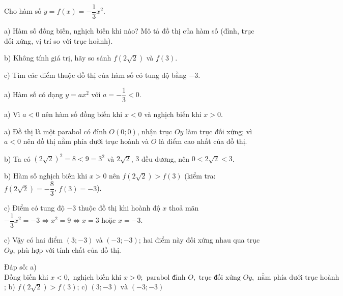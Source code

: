 \begin{problem}[9DS-HSB2-003]
Cho hàm số $y = f(x) = -\dfrac{1}{3}x^2$.

a) Hàm số đồng biến, nghịch biến khi nào? Mô tả đồ thị của hàm số (đỉnh, trục đối xứng, vị trí so với trục hoành).

b) Không tính giá trị, hãy so sánh $f\left(2\sqrt{2}\right)$ và $f(3)$.

c) Tìm các điểm thuộc đồ thị của hàm số có tung độ bằng $-3$.

\begin{solution}
a) Hàm số có dạng $y = ax^2$ với $a = -\dfrac{1}{3} < 0$.

a) Vì $a < 0$ nên hàm số đồng biến khi $x < 0$ và nghịch biến khi $x > 0$.

a) Đồ thị là một parabol có đỉnh $O(0; 0)$, nhận trục $Oy$ làm trục đối xứng; vì $a < 0$ nên đồ thị nằm phía dưới trục hoành và $O$ là điểm cao nhất của đồ thị.

b) Ta có $\left(2\sqrt{2}\right)^2 = 8 < 9 = 3^2$ và $2\sqrt{2}$, $3$ đều dương, nên $0 < 2\sqrt{2} < 3$.

b) Hàm số nghịch biến khi $x > 0$ nên $f\left(2\sqrt{2}\right) > f(3)$ (kiểm tra: $f\left(2\sqrt{2}\right) = -\dfrac{8}{3}$, $f(3) = -3$).

c) Điểm có tung độ $-3$ thuộc đồ thị khi hoành độ $x$ thoả mãn $-\dfrac{1}{3}x^2 = -3 \Leftrightarrow x^2 = 9 \Leftrightarrow x = 3$ hoặc $x = -3$.

c) Vậy có hai điểm $(3; -3)$ và $(-3; -3)$; hai điểm này đối xứng nhau qua trục $Oy$, phù hợp với tính chất của đồ thị.

Đáp số: a) $\boxed{\text{Đồng biến khi } x < 0, \text{ nghịch biến khi } x > 0; \text{ parabol đỉnh } O, \text{ trục đối xứng } Oy, \text{ nằm phía dưới trục hoành}}$; b) $\boxed{f\left(2\sqrt{2}\right) > f(3)}$; c) $\boxed{(3; -3) \text{ và } (-3; -3)}$
\end{solution}
\end{problem}

